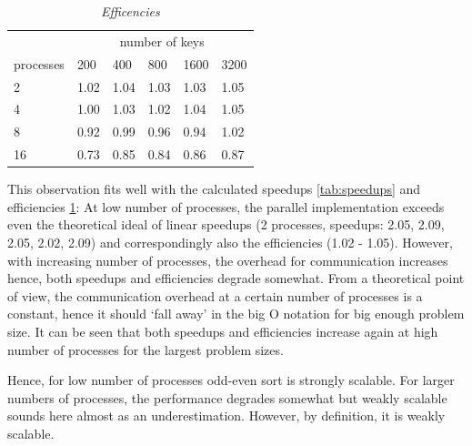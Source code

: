 \documentclass[a4paper,11pt,twoside]{article}
\begin{document}
\begin{table}[]
\centering
\caption{\textit{Efficencies}}
\label{tab:efficiencies}
\begin{tabular}{llllll}
\multicolumn{1}{l|}{}          & \multicolumn{5}{c}{number of keys}                                                                                \\ \cline{2-6} 
\multicolumn{1}{l|}{processes} & \multicolumn{1}{l|}{200} & \multicolumn{1}{l|}{400} & \multicolumn{1}{l|}{800} & \multicolumn{1}{l|}{1600} & 3200 \\ \hline
2                              & 1.02                     & 1.04                     & 1.03                     & 1.03                      & 1.05 \\
4                              & 1.00                     & 1.03                     & 1.02                     & 1.04                      & 1.05 \\
8                              & 0.92                     & 0.99                     & 0.96                     & 0.94                      & 1.02 \\
16                             & 0.73                     & 0.85                     & 0.84                     & 0.86                      & 0.87
\end{tabular}
\end{table}

This observation fits well with the calculated speedups \ref{tab:speedups} and efficiencies \ref{tab:efficiencies}: At low number of processes, the parallel implementation exceeds even the theoretical ideal of linear speedups (2 processes, speedups: 2.05, 2.09, 2.05, 2.02, 2.09) and correspondingly also the efficiencies (1.02 - 1.05). However, with increasing number of processes, the overhead for communication increases hence, both speedups and efficiencies degrade somewhat. From a theoretical point of view, the communication overhead at a certain number of processes is a constant, hence it should `fall away' in the big O notation for big enough problem size. It can be seen that both speedups and efficiencies increase again at high number of processes for the largest problem sizes.

Hence, for low number of processes odd-even sort is strongly scalable. For larger numbers of processes, the performance degrades somewhat but weakly scalable sounds here almost as an underestimation. However, by definition, it is weakly scalable. 
 
\end{document}
